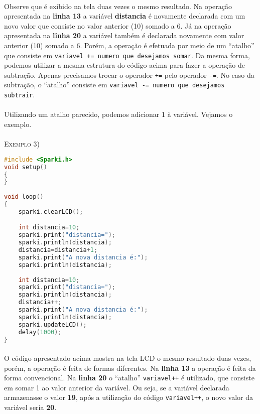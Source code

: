 \paragraph{}
Observe que é exibido na tela duas vezes o mesmo resultado. Na operação apresentada na \textbf{linha 13} a variável \textbf{distancia} é novamente declarada com um novo valor que consiste no valor anterior (10) somado a 6. Já na operação apresentada na \textbf{linha 20} a variável também é declarada novamente com valor anterior (10) somado a 6. Porém, a operação é efetuada por meio de um ``atalho'' que consiste em \lstinline[columns=fixed]{variavel += numero que desejamos somar}.  
Da mesma forma, podemos utilizar a mesma estrutura do código acima para fazer a operação de subtração. Apenas precisamos trocar o operador \lstinline[columns=fixed]{+=} pelo operador \lstinline[columns=fixed]{-=}. No caso da subtração, o ``atalho'' consiste em \lstinline[columns=fixed]{variavel -= numero que desejamos subtrair}.

\paragraph{}
Utilizando um atalho parecido,  podemos adicionar 1 à variável. Vejamos o exemplo.
\\~\\
\textsc{Exemplo 3)}
\begin{lstlisting}[language=C]
#include <Sparki.h> 
void setup()
{
}
 
void loop()
{
    sparki.clearLCD();

    int distancia=10;
    sparki.print("distancia=");
    sparki.println(distancia);
    distancia=distancia+1;
    sparki.print("A nova distancia é:");
    sparki.println(distancia); 
    
    int distancia=10;
    sparki.print("distancia=");
    sparki.println(distancia);
    distancia++;
    sparki.print("A nova distancia é:");
    sparki.println(distancia); 
    sparki.updateLCD();
    delay(1000); 
}
\end{lstlisting}

\paragraph{}
O código apresentado acima mostra na tela LCD o mesmo resultado duas vezes, porém, a operação é feita de formas diferentes. Na \textbf{linha 13} a operação é feita da forma convencional. Na \textbf{linha 20}  o ``atalho'' \lstinline[columns=fixed]{variavel++} é utilizado, que consiste em somar 1 ao valor anterior da variável. Ou seja, se a variável declarada armazenasse o valor \textbf{19}, após a utilização do código \lstinline[columns=fixed]{variavel++}, o novo valor da variável seria \textbf{20}.


